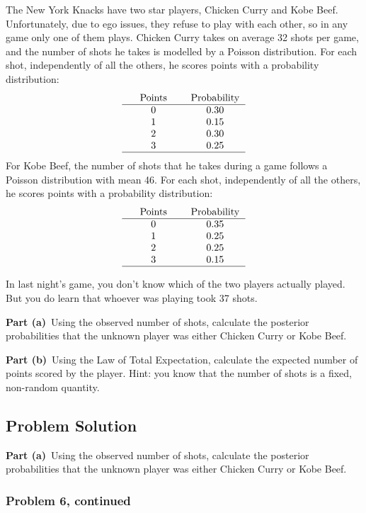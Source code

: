 \documentclass[12pt]{article}
\theoremstyle{definition}
\begin{document}
The New York Knacks have two star players, Chicken Curry and Kobe Beef. Unfortunately, due to ego issues, they refuse to play with each other, so in any game only one of them plays. Chicken Curry takes on average 32 shots per game, and the number of shots he takes is modelled by a Poisson distribution. For each shot, independently of all the others, he scores points with a probability distribution:
$$
\begin{tabular}{ccccc}
& Points & & Probability\\
\hline
& 0 & & 0.30\\
& 1 & & 0.15\\
& 2 & & 0.30\\
& 3 & & 0.25\\
\hline
\end{tabular}
$$
For Kobe Beef, the number of shots that he takes during a game follows a Poisson distribution with mean 46. For each shot, independently of all the others, he scores points with a probability distribution:
$$
\begin{tabular}{ccccc}
& Points & & Probability\\
\hline
& 0 & & 0.35\\
& 1 & & 0.25\\
& 2 & & 0.25\\
& 3 & & 0.15\\
\hline
\end{tabular}
$$

\bigskip
In last night's game, you don't know which of the two players actually played. But you do learn that whoever was playing took 37 shots. 

\bigskip
\noindent
{\bf Part (a)}\ Using the observed number of shots, calculate the posterior probabilities that the unknown player was either Chicken Curry or Kobe Beef.

\bigskip
\noindent
{\bf Part (b)}\ Using the Law of Total Expectation, calculate the expected number of points scored by the player. Hint: you know that the number of shots is a fixed, non-random quantity.

\newpage
\subsection*{Problem Solution}

\noindent
{\bf Part (a)}\ Using the observed number of shots, calculate the posterior probabilities that the unknown player was either Chicken Curry or Kobe Beef.

\newpage
\subsubsection*{Problem 6, continued}
\end{document}
